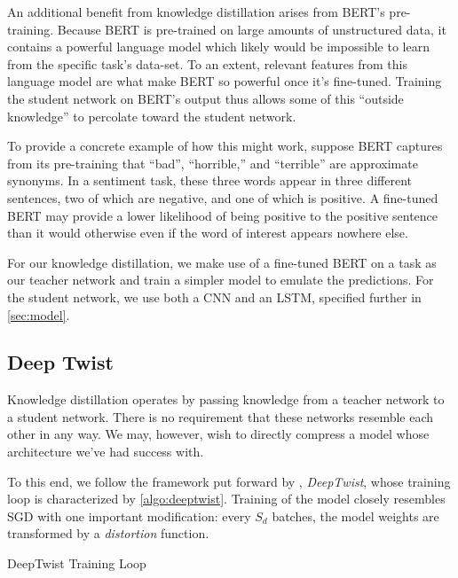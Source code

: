 \documentclass[10pt]{article}
\newcommand{\distortion}{\operatorname{Distortion}}
\begin{document}
An additional benefit from knowledge distillation arises from BERT's
pre-training. Because BERT is pre-trained on large amounts of unstructured
data, it contains a powerful language model which likely would be impossible
to learn from the specific task's data-set. To an extent, relevant features
from this language model are what make BERT so powerful once it's fine-tuned.
Training the student network on BERT's output thus allows some of this
``outside knowledge'' to percolate toward the student network.

To provide a concrete example of how this might work, suppose BERT captures
from its pre-training that ``bad'', ``horrible,'' and ``terrible'' are
approximate synonyms. In a sentiment task, these three words appear in three
different sentences, two of which are negative, and one of which is positive.
A fine-tuned BERT may provide a lower likelihood of being positive to the
positive sentence than it would otherwise even if the word of interest appears
nowhere else.

For our knowledge distillation, we make use of a fine-tuned BERT on a task as
our teacher network and train a simpler model to emulate the predictions. For
the student network, we use both a CNN and an LSTM, specified further in
\cref{sec:model}.

\subsection{Deep Twist}

Knowledge distillation operates by passing knowledge from a teacher network to a
student network. There is no requirement that these networks resemble each other
in any way. We may, however, wish to directly compress a model whose
architecture we've had success with.

To this end, we follow the framework put forward by \citet{lee2018deeptwist},
\emph{DeepTwist}, whose training loop is characterized by \cref{algo:deeptwist}.
Training of the model closely resembles SGD with one important modification:
every $S_d$ batches, the model weights are transformed by a \emph{distortion}
function. 

\begin{algorithm}
  \begin{algorithmic}
        \STATE{$\theta \leftarrow \distortion(\theta)$}
      \ENDIF
    \ENDFOR
    \STATE{$\theta \leftarrow \distortion(\theta)$}
  \end{algorithmic}
  \caption{DeepTwist Training Loop}
  \label{algo:deeptwist}
\end{algorithm}
\end{document}
